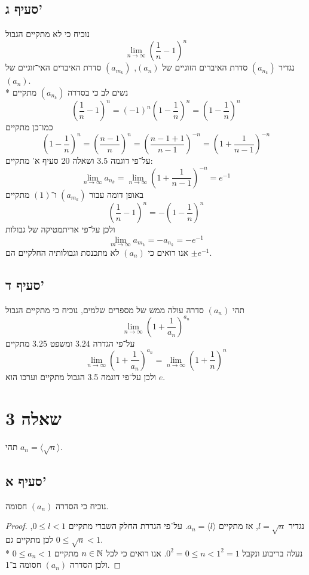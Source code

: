 \subsection{סעיף ג'}
נוכיח כי לא מתקיים הגבול
\[
	\lim_{n \to \infty} {\left( \frac{1}{n} - 1 \right)}^n
\]
נגדיר $(a_{n_k})$ סדרת האיברים הזוגיים של $(a_n)$, $(a_{m_k})$ סדרת האיברים האי־זוגיים של $(a_n)$. \\*
נשים לב כי בסדרה $(a_{n_k})$ מתקיים
\[
	{\left( \frac{1}{n} - 1 \right)}^n
	= {(-1)}^n {\left( 1 - \frac{1}{n} \right)}^n
	= {\left( 1 - \frac{1}{n} \right)}^n
	\tag{1}
\]
כמו־כן מתקיים
\[
	{\left( 1 - \frac{1}{n} \right)}^n
	= {\left( \frac{n - 1}{n} \right)}^n
	= {\left( \frac{n - 1 + 1}{n - 1} \right)}^{-n}
	= {\left( 1 + \frac{1}{n - 1} \right)}^{-n}
\]
על־פי דוגמה 3.5 ושאלה 20 סעיף א' מתקיים:
\[
	\lim_{n \to \infty} a_{n_k}
	= \lim_{n \to \infty} {\left( 1 + \frac{1}{n - 1} \right)}^{-n}
	= e^{-1}
\]
באופן דומה עבור $(a_{m_k})$ ו־$(1)$ מתקיים
\[
	{\left( \frac{1}{n} - 1 \right)}^n
	= -{\left( 1 - \frac{1}{n} \right)}^n
\]
ולכן על־פי אריתמטיקה של גבולות
\[
	\lim_{m \to \infty} a_{m_k} = - a_{n_k} = -e^{-1}
\]
אנו רואים כי $(a_n)$ לא מתכנסת וגבולותיה החלקיים הם $\pm e^{-1}$.

\subsection{סעיף ד'}
תהי $(a_n)$ סדרה עולה ממש של מספרים שלמים, נוכיח כי מתקיים הגבול
\[
	\lim_{n \to \infty} {\left( 1 + \frac{1}{a_n} \right)}^{a_n}
\]
על־פי הגדרה 3.24 ומשפט 3.25 מתקיים
\[
	\lim_{n \to \infty} {\left( 1 + \frac{1}{a_n} \right)}^{a_n}
	= \lim_{n \to \infty} {\left( 1 + \frac{1}{n} \right)}^{n}
\]
ולכן על־פי דוגמה 3.5 הגבול מתקיים וערכו הוא $e$.

\section{שאלה 3}
תהי $a_n = \langle \sqrt{n} \rangle$.
\subsection{סעיף א'}
נוכיח כי הסדרה $(a_n)$ חסומה.
\begin{proof}
	נגדיר $l = \sqrt{n}$, אז מתקיים $a_n = \langle l \rangle$. על־פי הגדרת החלק השברי מתקיים $0 \le l < 1$, לכן מתקיים גם $0 \le \sqrt{n} < 1$. \\*
	נעלה בריבוע ונקבל $0^2 = 0 \le n < 1^2 = 1$. אנו רואים כי לכל $n \in \mathbb{N}$ מתקיים $0 \le a_n < 1$ ולכן הסדרה $(a_n)$ חסומה ב־1.
\end{proof}

